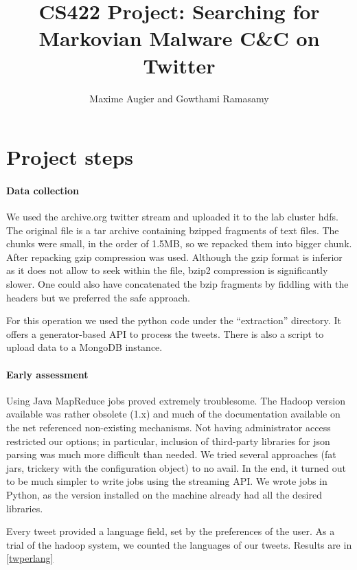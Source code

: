 \documentclass[a4paper,11pt]{article}
\title{CS422 Project: Searching for Markovian Malware C\&C on Twitter}
\author{Maxime Augier and Gowthami Ramasamy}
\begin{document}
\maketitle



\section{Project steps}

\paragraph{Data collection}

We used the archive.org twitter stream and uploaded it to the lab cluster hdfs. The original file is a tar archive containing bzipped fragments of text files. The chunks were small, in the order of 1.5MB, so we repacked them into bigger chunk. After repacking gzip compression was used. Although the gzip format is inferior as it does not allow to seek within the file, bzip2 compression is significantly slower. One could also have concatenated the bzip fragments by fiddling with the headers but we preferred the safe approach.

For this operation we used the python code under the ``extraction'' directory. It offers a generator-based API to process the tweets. There is also a script to upload data to a MongoDB instance.

\paragraph{Early assessment}

Using Java MapReduce jobs proved extremely troublesome. The Hadoop version available was rather obsolete (1.x) and much of the documentation available on the net referenced non-existing mechanisms. Not having administrator access restricted our options; in particular, inclusion of third-party libraries for json parsing was much more difficult than needed. We tried several approaches (fat jars, trickery with the configuration object) to no avail. In the end, it turned out to be much simpler to write jobs using the streaming API. We wrote jobs in Python, as the version installed on the machine already had all the desired libraries.

Every tweet provided a language field, set by the preferences of the user. As a trial of the hadoop system, we counted the languages of our tweets. Results are in \ref{twperlang}
\end{document}

